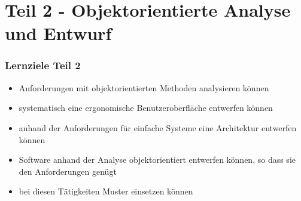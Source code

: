 \part{Teil 2 - Objektorientierte Analyse und Entwurf}

\newpage
\section*{Lernziele Teil 2}

\begin{itemize}
    \item Anforderungen mit objektorientierten Methoden analysieren können
    \item systematisch eine ergonomische Benutzeroberfläche entwerfen können
    \item anhand der Anforderungen für einfache Systeme eine Architektur entwerfen können
    \item Software anhand der Analyse objektorientiert  entwerfen können, so dass sie den Anforderungen genügt
    \item bei diesen Tätigkeiten Muster einsetzen können
\end{itemize}

\newpage
